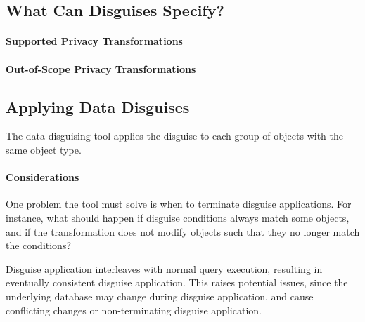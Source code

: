 
\subsection{What Can Disguises Specify?}

\paragraph{Supported Privacy Transformations}

\paragraph{Out-of-Scope Privacy Transformations}

\subsection{Applying Data Disguises}
The data disguising tool applies the disguise to each group of objects with the same object type.

\paragraph{Considerations}
One problem the tool must solve is when to terminate disguise applications. For instance, what
should happen if disguise conditions always match some objects, and if the transformation
does not modify objects such that they no longer match the conditions?

Disguise application interleaves with normal query execution, resulting in eventually consistent
disguise application. This raises potential issues, since the underlying database may change during
disguise application, and cause conflicting changes or non-terminating disguise application.

\fi
